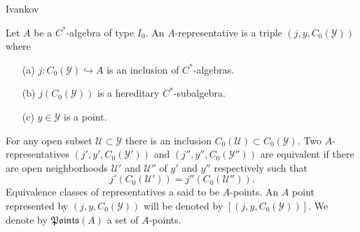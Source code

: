 \documentclass{beamer}
\theoremstyle{plain}
\newcommand{\sU}{\mathcal{U}}       %
\newcommand{\sY}{\mathcal{Y}}       %
\newcommand{\hookto}{\hookrightarrow}        %
\begin{document}
\begin{frame}
	\begin{definition}\alert{Ivankov}
			
		Let $A$ be a $C^*$-algebra of type $I_0$. An $A$-\alert{representative}  is a triple $\left( j, y, C_0\left( \sY\right) \right)$ where 
		\begin{enumerate}
			\item[(a)]  $j: C_0\left(\sY \right) \hookto A$ is an inclusion of $C^*$-algebras.
			\item[(b)] $j\left( C_0\left(\sY \right)\right) $ is a hereditary $C^*$-subalgebra.
			\item[(c)] $y \in \sY$ is a point.
		\end{enumerate}
		For any open subset $\sU\subset \sY$ there is an inclusion $C_0\left(\sU\right)\subset C_0\left(\sY\right)$.
	Two $A$-{representatives} $\left( j', y',  C_0\left( \sY'\right)\right)$ and  $\left( j'', y'',  C_0\left( \sY''\right)\right)$ are \alert{equivalent} if there are open neighborhoods $\sU'$ and $\sU''$ of $y'$ and $y''$ respectively such that
$$
j'\left(C_0\left( 
\sU'\right) \right) = j''\left(C_0\left( 
\sU''\right) \right).
$$
Equivalence classes of representatives a said to be  $A$-\alert{points}. An $A$ point represented by  $\left( j,y,  C_0\left( \sY\right)\right)$   will be denoted by $\left[\left( j, y,  C_0\left( \sY\right)\right)\right]$.  We denote by $\mathfrak{Points}\left(A \right)$ a set of $A$-points.  
\end{definition}
\end{frame}
\end{document}
